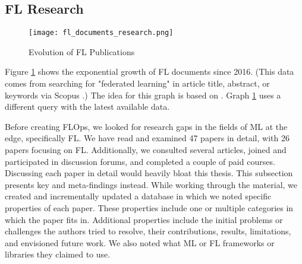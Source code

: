 
\subsection{FL Research}\label{subsection:fl_research}

\begin{figure}[h]
    \centering
    \texttt{[image: fl\_documents\_research.png]}
    \caption{Evolution of FL Publications}
    \label{fig:fl_documents_research}
\end{figure}

Figure \ref{fig:fl_documents_research} shows the exponential growth of FL documents since 2016.
(This data comes from searching for "federated learning" in article title, abstract, or keywords via Scopus \cite{scopus_homepage}.)
The idea for this graph is based on \cite{thesis:tum_fl_framework_comparison}.
Graph \ref{fig:fl_documents_research} uses a different query with the latest available data.

Before creating FLOps, we looked for research gaps in the fields of ML at the edge, specifically FL.
We have read and examined 47 papers in detail, with 26 papers focusing on FL. 
Additionally, we consulted several articles, joined and participated in discussion forums, and completed a couple of paid courses.
Discussing each paper in detail would heavily bloat this thesis.
This subsection presents key and meta-findings instead.
While working through the material, we created and incrementally updated a database in which we noted specific properties of each paper.
These properties include one or multiple categories in which the paper fits in.
Additional properties include the initial problems or challenges the authors tried to resolve, their contributions, results, limitations, and envisioned future work.
We also noted what ML or FL frameworks or libraries they claimed to use.

